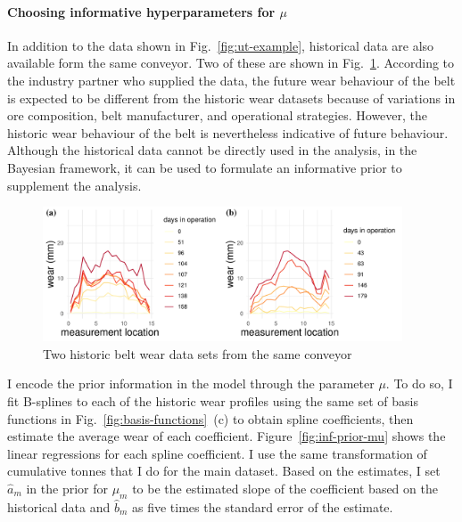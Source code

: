 \paragraph*{Choosing informative hyperparameters for $\mu$} In addition to the data shown in Fig.~\ref{fig:ut-example}, historical data are also available form the same conveyor. Two of these are shown in Fig.~\ref{fig:previouse-belts}. According to the industry partner who supplied the data, the future wear behaviour of the belt is expected to be different from the historic wear datasets because of variations in ore composition, belt manufacturer, and operational strategies. However, the historic wear behaviour of the belt is nevertheless indicative of future behaviour. Although the historical data cannot be directly used in the analysis, in the Bayesian framework, it can be used to formulate an informative prior to supplement the analysis.

\begin{figure}[tbp]
  \centering
  \includegraphics[width=0.95\textwidth]{figures/ch-6/historic_belts.pdf}
  \caption{Two historic belt wear data sets from the same conveyor}
  \label{fig:previouse-belts}
\end{figure}

I encode the prior information in the model through the parameter $\mu$. To do so, I fit B-splines to each of the historic wear profiles using the same set of basis functions in Fig.~\ref{fig:basis-functions}~(c) to obtain spline coefficients, then estimate the average wear of each coefficient. Figure~\ref{fig:inf-prior-mu} shows the linear regressions for each spline coefficient. I use the same transformation of cumulative tonnes that I do for the main dataset. Based on the estimates, I set $\hat{a}_m$ in the prior for $\mu_m$ to be the estimated slope of the coefficient based on the historical data and $\hat{b}_m$ as five times the standard error of the estimate.

